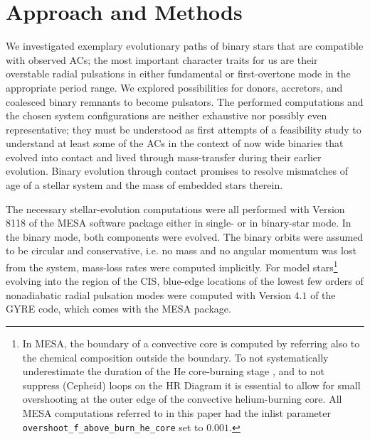 \documentclass[a4paper,fleqn,usenatbib]{mnras}
\begin{document}
 
\section{Approach and Methods}
We investigated exemplary evolutionary paths of binary stars that are
compatible with observed ACs; the most important character traits for
us are their overstable radial pulsations in either fundamental or
first-overtone mode in the appropriate period range.  We explored
possibilities for donors, accretors, and coalesced binary remnants to
become pulsators. The performed computations and the chosen system
configurations are neither exhaustive nor possibly even
representative; they must be understood as first attempts of a
feasibility study to understand at least some of the ACs in the
context of now wide binaries that evolved into contact and lived
through mass-transfer during their earlier evolution. Binary evolution
through contact promises to resolve mismatches of age of a stellar
system and the mass of embedded stars therein.

The necessary stellar-evolution computations were all performed with
Version 8118 of the MESA software package either in single- or in
binary-star mode. In the binary mode, both components were evolved.
The binary orbits were assumed to be circular and conservative,
i.e. no mass and no angular momentum was lost from the system,
mass-loss rates were computed implicitly.  For model
stars\footnote{In MESA, the boundary of a convective core is computed by referring 
also to the chemical composition outside the boundary. 
To not systematically underestimate the duration of the He core-burning stage  
\citep[cf.][]{Bossini2015}, and to not suppress (Cepheid) loops on the HR Diagram
it is essential to allow for small overshooting at the outer edge of the convective 
helium-burning core. All MESA computations referred to in this paper had the
inlist parameter \texttt{overshoot\_f\_above\_burn\_he\_core} set to $0.001$.}
evolving into the region of the CIS, 
blue-edge locations of the lowest few orders of nonadiabatic radial pulsation 
modes were computed with Version $4.1$ of the GYRE code, which comes with the MESA package. 
\end{document}
